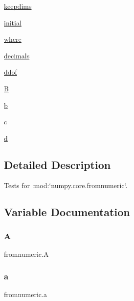 \begin{DoxyCompactItemize}
\hyperlink{namespacefromnumeric_af64f4e3d6a1a7bb04ee005dc99bf281d}{keepdims}
\item 
\hyperlink{namespacefromnumeric_a6e4c2d1d4f97f7b0a0abfffb9646553c}{initial}
\item 
\hyperlink{namespacefromnumeric_aa5370d88bcdab4fed98b6884070ae085}{where}
\item 
\hyperlink{namespacefromnumeric_a36e33f452fd27d74bbc83a2b3c83a90e}{decimals}
\item 
\hyperlink{namespacefromnumeric_a10920b845f0d718378927398ffe69533}{ddof}
\item 
\hyperlink{namespacefromnumeric_a76cad807546255b487e9644e9f3d0ca4}{B}
\item 
\hyperlink{namespacefromnumeric_a5f934b9551bbc1cb2a0a6bcbeb901821}{b}
\item 
\hyperlink{namespacefromnumeric_ab55ae64310289b9df207a07c33b3f431}{c}
\item 
\hyperlink{namespacefromnumeric_af6c3edc6000edd723cf4a35057b9ade4}{d}
\end{DoxyCompactItemize}


\subsection{Detailed Description}
\begin{DoxyVerb}Tests for :mod:`numpy.core.fromnumeric`.\end{DoxyVerb}
 

\subsection{Variable Documentation}
\mbox{\label{namespacefromnumeric_aa9673496ca3d00c28a2a7c08b6257240}} 
\subsubsection{\texorpdfstring{A}{A}}
{\footnotesize\ttfamily fromnumeric.\+A}

\mbox{\label{namespacefromnumeric_a72a6aa894ee1c03532591e6c4d952c54}} 
\subsubsection{\texorpdfstring{a}{a}}
{\footnotesize\ttfamily fromnumeric.\+a}

